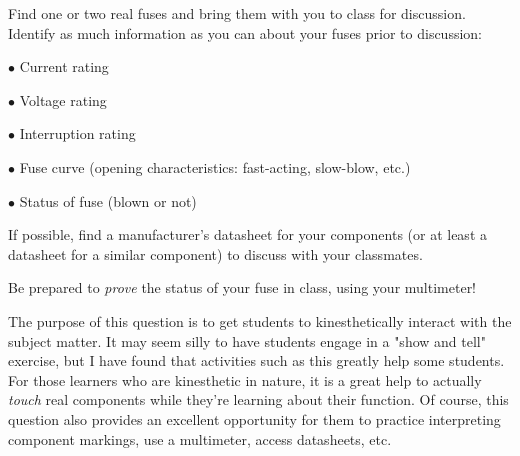 

Find one or two real fuses and bring them with you to class for discussion.  Identify as much information as you can about your fuses prior to discussion:

\medskip
\item{$\bullet$} Current rating
\item{$\bullet$} Voltage rating
\item{$\bullet$} Interruption rating
\item{$\bullet$} Fuse curve (opening characteristics: fast-acting, slow-blow, etc.)
\item{$\bullet$} Status of fuse (blown or not)
\medskip







If possible, find a manufacturer's datasheet for your components (or at least a datasheet for a similar component) to discuss with your classmates.

Be prepared to {\it prove} the status of your fuse in class, using your multimeter!







The purpose of this question is to get students to kinesthetically interact with the subject matter.  It may seem silly to have students engage in a "show and tell" exercise, but I have found that activities such as this greatly help some students.  For those learners who are kinesthetic in nature, it is a great help to actually {\it touch} real components while they're learning about their function.  Of course, this question also provides an excellent opportunity for them to practice interpreting component markings, use a multimeter, access datasheets, etc.




